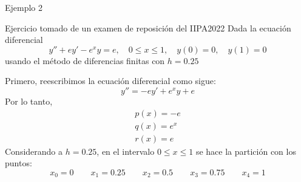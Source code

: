 \begin{frame}{Ejemplo 2}
\begin{block}{Ejercicio tomado de un examen de reposición del IIPA2022}
Dada la ecuación diferencial 
$$y''+ey'-e^xy=e, \quad 0\leq x \leq 1, \quad y(0)=0, \quad y(1)=0$$
usando el método de diferencias finitas con $h=0.25$
\end{block}
Primero, reescribimos la ecuación diferencial como sigue:
$$y''=-ey'+e^xy+e$$
Por lo tanto, 
\begin{displaymath}
\begin{array}{l}
p(x)=-e\\
q(x)=e^x\\
r(x)=e
\end{array}
\end{displaymath}
Considerando a $h=0.25$, en el intervalo $0\leq x \leq 1$ se hace la partición con los puntos:
$$x_0=0 \qquad x_1=0.25 \qquad x_2=0.5 \qquad x_3=0.75 \qquad x_4=1$$
\end{frame}

